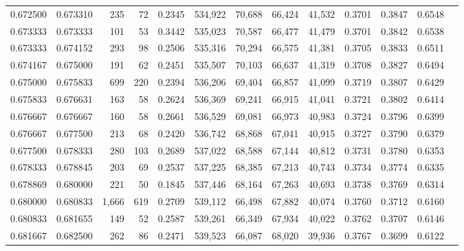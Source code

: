 \begin{tabular}{rrrrrrrrrrrrr}
0.672500 & 0.673310 &   235 &  72 &                                     0.2345 & 534,922 &  70,688 &  66,424 &  41,532 & 0.3701 & 0.3847 & 0.6548 \\
0.673333 & 0.673333 &   101 &  53 &                                     0.3442 & 535,023 &  70,587 &  66,477 &  41,479 & 0.3701 & 0.3842 & 0.6538 \\
0.673333 & 0.674152 &   293 &  98 &                                     0.2506 & 535,316 &  70,294 &  66,575 &  41,381 & 0.3705 & 0.3833 & 0.6511 \\
0.674167 & 0.675000 &   191 &  62 &                                     0.2451 & 535,507 &  70,103 &  66,637 &  41,319 & 0.3708 & 0.3827 & 0.6494 \\
0.675000 & 0.675833 &   699 & 220 &                                     0.2394 & 536,206 &  69,404 &  66,857 &  41,099 & 0.3719 & 0.3807 & 0.6429 \\
0.675833 & 0.676631 &   163 &  58 &                                     0.2624 & 536,369 &  69,241 &  66,915 &  41,041 & 0.3721 & 0.3802 & 0.6414 \\
0.676667 & 0.676667 &   160 &  58 &                                     0.2661 & 536,529 &  69,081 &  66,973 &  40,983 & 0.3724 & 0.3796 & 0.6399 \\
0.676667 & 0.677500 &   213 &  68 &                                     0.2420 & 536,742 &  68,868 &  67,041 &  40,915 & 0.3727 & 0.3790 & 0.6379 \\
0.677500 & 0.678333 &   280 & 103 &                                     0.2689 & 537,022 &  68,588 &  67,144 &  40,812 & 0.3731 & 0.3780 & 0.6353 \\
0.678333 & 0.678845 &   203 &  69 &                                     0.2537 & 537,225 &  68,385 &  67,213 &  40,743 & 0.3734 & 0.3774 & 0.6335 \\
0.678869 & 0.680000 &   221 &  50 &                                     0.1845 & 537,446 &  68,164 &  67,263 &  40,693 & 0.3738 & 0.3769 & 0.6314 \\
0.680000 & 0.680833 & 1,666 & 619 &                                     0.2709 & 539,112 &  66,498 &  67,882 &  40,074 & 0.3760 & 0.3712 & 0.6160 \\
0.680833 & 0.681655 &   149 &  52 &                                     0.2587 & 539,261 &  66,349 &  67,934 &  40,022 & 0.3762 & 0.3707 & 0.6146 \\
0.681667 & 0.682500 &   262 &  86 &                                     0.2471 & 539,523 &  66,087 &  68,020 &  39,936 & 0.3767 & 0.3699 & 0.6122 \\

\end{tabular}
